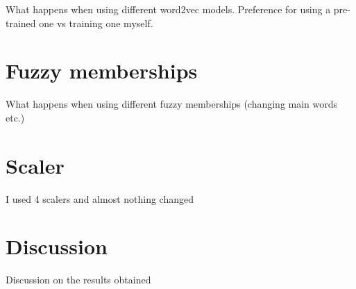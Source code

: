 What happens when using different word2vec models. Preference for using a pre-trained one vs training one myself.

\section{Fuzzy memberships}
\label{sec:results_fuzzy}

What happens when using different fuzzy memberships (changing main words etc.)

\section{Scaler}
\label{sec:results_scaler}

I used 4 scalers and almost nothing changed

\section{Discussion}
\label{sec:results_discussion}

Discussion on the results obtained
